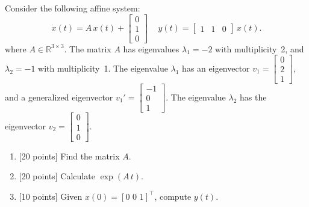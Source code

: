 \documentclass[a4paper,10.5pt]{article}
\newcommand{\R}{\mathbb{R}}
\begin{document}
Consider the following affine system:
\begin{equation*}
  \dot{x}(t) = A\, x(t) + 
  \begin{bmatrix}
0\\ 1\\ 0\end{bmatrix}\, \quad
  y(t) = \begin{bmatrix}1 & 1 & 0\end{bmatrix}\, x(t).
\end{equation*}
where $A \in \R^{3 \times 3}$.
The matrix $A$ has eigenvalues $\lambda_1 = -2$ with multiplicity~2, and $\lambda_2 = -1$ with multiplicity~1.
The eigenvalue $\lambda_1$ has an eigenvector $v_1 = \begin{bmatrix}0\\ 2\\ 1\end{bmatrix}$, and a generalized eigenvector $v_1' = \begin{bmatrix}-1\\ 0\\ 1\end{bmatrix}$.
The eigenvalue $\lambda_2$ has the eigenvector $v_2 = \begin{bmatrix}0\\ 1\\ 0\end{bmatrix}$.
\begin{enumerate}
	\item $[$20 points$]$ Find the matrix $A$.
	\item $[$20 points$]$ Calculate $\exp(A\, t)$.
	\item $[$10 points$]$ Given $x(0)=[0\,\,0\,\,1]^{\top}$, compute $y(t)$.
\end{enumerate}
\end{document}
